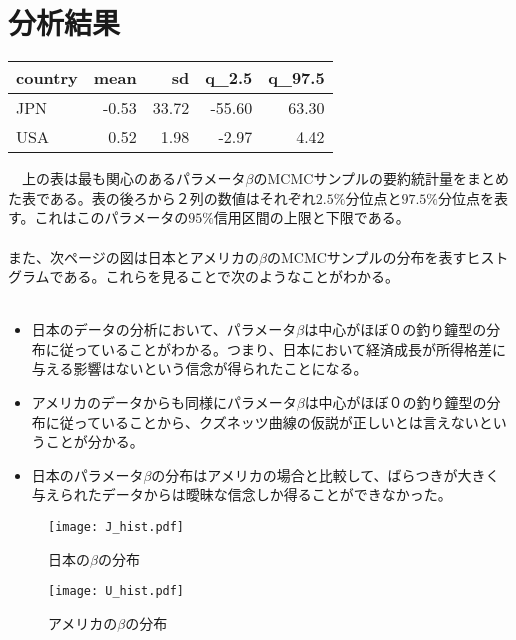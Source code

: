 \documentclass{bxjsarticle}
\begin{document}
\section{分析結果}

\begin{table}[H]
\centering\begingroup\fontsize{15}{17}\selectfont

\begin{tabular}[t]{lrrrr}
\toprule
country & mean & sd & q\_2.5 & q\_97.5\\
\midrule
JPN & -0.53 & 33.72 & -55.60 & 63.30\\
USA & 0.52 & 1.98 & -2.97 & 4.42\\
\bottomrule
\end{tabular}
\endgroup{}
\end{table}
　上の表は最も関心のあるパラメータ$\beta$のMCMCサンプルの要約統計量をまとめた表である。表の後ろから２列の数値はそれぞれ$2.5\%$分位点と$97.5\%$分位点を表す。これはこのパラメータの$95\%$信用区間の上限と下限である。\\
 \\
 また、次ページの図は日本とアメリカの$\beta$のMCMCサンプルの分布を表すヒストグラムである。これらを見ることで次のようなことがわかる。\\
\\
\begin{itemize}
    \item 日本のデータの分析において、パラメータ$\beta$は中心がほぼ０の釣り鐘型の分布に従っていることがわかる。つまり、日本において経済成長が所得格差に与える影響はないという信念が得られたことになる。\\
    \item アメリカのデータからも同様にパラメータ$\beta$は中心がほぼ０の釣り鐘型の分布に従っていることから、クズネッツ曲線の仮説が正しいとは言えないということが分かる。\\
    \item 日本のパラメータ$\beta$の分布はアメリカの場合と比較して、ばらつきが大きく与えられたデータからは曖昧な信念しか得ることができなかった。\\
    
\end{itemize}

 \newpage
\begin{figure}[H]
\centering
\texttt{[image: J\_hist.pdf]}
\caption{日本の$\beta$の分布}
\end{figure}

\begin{figure}[H]
\centering
\texttt{[image: U\_hist.pdf]}
\caption{アメリカの$\beta$の分布}
\end{figure}
\end{document}
